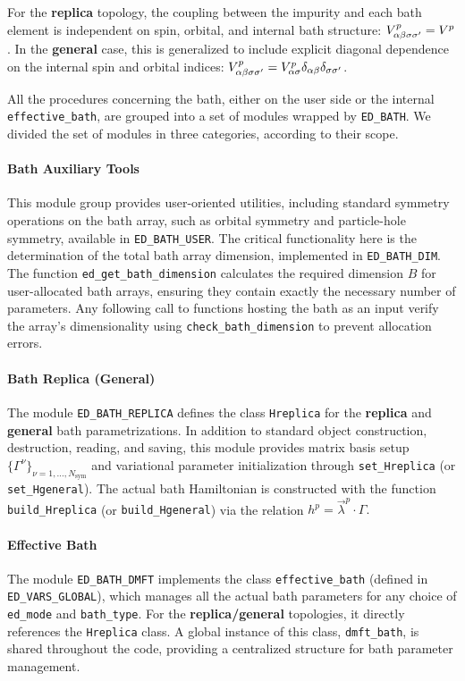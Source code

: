 \documentclass[edipack2.tex]{subfiles}
\begin{document}
For the {\bf replica} topology, the coupling between the impurity 
and each bath element is independent on spin, orbital, and internal 
bath structure: $V^p_{\alpha\beta\sigma\sigma'} = V^p$.
In the {\bf general} case, this is generalized to include explicit 
diagonal
dependence on the internal spin and orbital indices: $V^p_{\alpha\beta\sigma\sigma'}
= V^p_{\alpha\sigma}\delta_{\alpha\beta}\delta_{\sigma\sigma'}$. 



All the procedures concerning the bath, either on the user side or the
internal {\tt effective\_bath}, are grouped into a set of modules
wrapped by {\tt ED\_BATH}. We divided the set of modules in three
categories, according to their scope.

\paragraph{Bath Auxiliary Tools}
This module group provides user-oriented utilities, including 
standard symmetry operations on the bath array, such as orbital 
symmetry and particle-hole symmetry, available in 
{\tt ED\_BATH\_USER}. The critical functionality here is the 
determination of the total bath array dimension, implemented in 
{\tt ED\_BATH\_DIM}. The function {\tt ed\_get\_bath\_dimension} 
calculates the required dimension $B$ for user-allocated bath 
arrays, ensuring they contain exactly the necessary number of 
parameters. Any following call
to functions hosting the bath as an input verify the array's 
dimensionality using {\tt check\_bath\_dimension} to prevent 
allocation errors.


\paragraph{Bath Replica (General)}
The module {\tt ED\_BATH\_REPLICA} defines the class {\tt Hreplica} 
for the {\bf replica} and {\bf general} bath parametrizations. In 
addition to standard object construction, destruction, reading, and 
saving, this module provides matrix basis setup 
$\{ \Gamma^\nu \}_{\nu=1,\dots,N_\mathrm{sym}}$ and variational parameter 
initialization through {\tt set\_Hreplica} (or {\tt set\_Hgeneral}). 
The actual bath Hamiltonian is constructed with the function 
{\tt build\_Hreplica} (or {\tt build\_Hgeneral}) via the relation
$
h^p = \vec{\lambda}^p \cdot \Gamma.
$



\paragraph{Effective Bath}
The module {\tt ED\_BATH\_DMFT} implements the class 
{\tt effective\_bath} (defined in {\tt ED\_VARS\_GLOBAL}), which 
manages all the actual bath parameters for any choice of 
{\tt ed\_mode} and {\tt bath\_type}. For the 
{\bf replica/general} topologies, it directly references the 
{\tt Hreplica} class. A global instance of this class, 
{\tt dmft\_bath}, is shared throughout the code, providing a 
centralized structure for bath parameter management.
\end{document}
